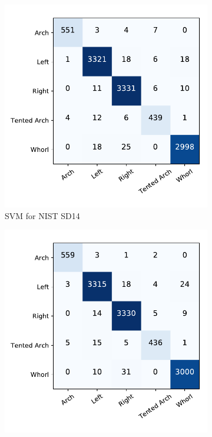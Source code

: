 \begin{figure}[!ht]
	\begin{subfigure}[b]{0.25\textwidth}
		\centering
		\includegraphics[width=\linewidth]{fig/figs/confusion_matrix_svm_sd14.pdf}
		\caption{SVM for NIST SD14 }
		\label{fig.cnf_matrix_5class.svm_sd14}
	\end{subfigure}%
	\begin{subfigure}[b]{0.25\textwidth}
		\centering
		\includegraphics[width=\linewidth]{fig/figs/confusion_matrix_net_sd14.pdf}

\end{subfigure}
\end{figure}
